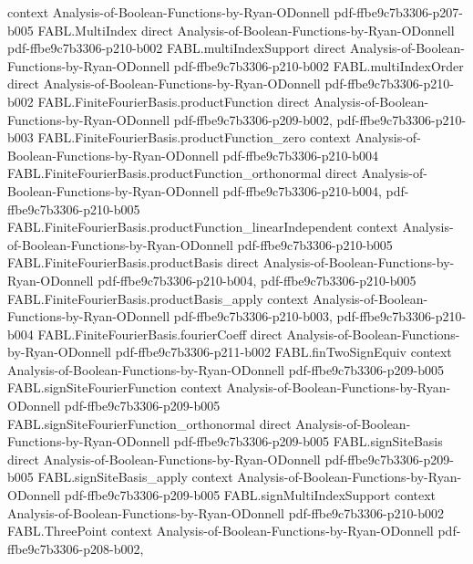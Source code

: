\begin{theorem}
  {context}
  {Analysis-of-Boolean-Functions-by-Ryan-ODonnell}
  {pdf-ffbe9c7b3306-p207-b005}
\proofstep
  {FABL.MultiIndex}
  {direct}
  {Analysis-of-Boolean-Functions-by-Ryan-ODonnell}
  {pdf-ffbe9c7b3306-p210-b002}
\proofstep
  {FABL.multiIndexSupport}
  {direct}
  {Analysis-of-Boolean-Functions-by-Ryan-ODonnell}
  {pdf-ffbe9c7b3306-p210-b002}
\proofstep
  {FABL.multiIndexOrder}
  {direct}
  {Analysis-of-Boolean-Functions-by-Ryan-ODonnell}
  {pdf-ffbe9c7b3306-p210-b002}
\proofstep
  {FABL.FiniteFourierBasis.productFunction}
  {direct}
  {Analysis-of-Boolean-Functions-by-Ryan-ODonnell}
  {pdf-ffbe9c7b3306-p209-b002,
    pdf-ffbe9c7b3306-p210-b003}
\proofstep
  {FABL.FiniteFourierBasis.productFunction_zero}
  {context}
  {Analysis-of-Boolean-Functions-by-Ryan-ODonnell}
  {pdf-ffbe9c7b3306-p210-b004}
\proofstep
  {FABL.FiniteFourierBasis.productFunction_orthonormal}
  {direct}
  {Analysis-of-Boolean-Functions-by-Ryan-ODonnell}
  {pdf-ffbe9c7b3306-p210-b004,
    pdf-ffbe9c7b3306-p210-b005}
\proofstep
  {FABL.FiniteFourierBasis.productFunction_linearIndependent}
  {context}
  {Analysis-of-Boolean-Functions-by-Ryan-ODonnell}
  {pdf-ffbe9c7b3306-p210-b005}
\proofstep
  {FABL.FiniteFourierBasis.productBasis}
  {direct}
  {Analysis-of-Boolean-Functions-by-Ryan-ODonnell}
  {pdf-ffbe9c7b3306-p210-b004,
    pdf-ffbe9c7b3306-p210-b005}
\proofstep
  {FABL.FiniteFourierBasis.productBasis_apply}
  {context}
  {Analysis-of-Boolean-Functions-by-Ryan-ODonnell}
  {pdf-ffbe9c7b3306-p210-b003,
    pdf-ffbe9c7b3306-p210-b004}
\proofstep
  {FABL.FiniteFourierBasis.fourierCoeff}
  {direct}
  {Analysis-of-Boolean-Functions-by-Ryan-ODonnell}
  {pdf-ffbe9c7b3306-p211-b002}
\proofstep
  {FABL.finTwoSignEquiv}
  {context}
  {Analysis-of-Boolean-Functions-by-Ryan-ODonnell}
  {pdf-ffbe9c7b3306-p209-b005}
\proofstep
  {FABL.signSiteFourierFunction}
  {context}
  {Analysis-of-Boolean-Functions-by-Ryan-ODonnell}
  {pdf-ffbe9c7b3306-p209-b005}
\proofstep
  {FABL.signSiteFourierFunction_orthonormal}
  {direct}
  {Analysis-of-Boolean-Functions-by-Ryan-ODonnell}
  {pdf-ffbe9c7b3306-p209-b005}
\proofstep
  {FABL.signSiteBasis}
  {direct}
  {Analysis-of-Boolean-Functions-by-Ryan-ODonnell}
  {pdf-ffbe9c7b3306-p209-b005}
\proofstep
  {FABL.signSiteBasis_apply}
  {context}
  {Analysis-of-Boolean-Functions-by-Ryan-ODonnell}
  {pdf-ffbe9c7b3306-p209-b005}
\proofstep
  {FABL.signMultiIndexSupport}
  {context}
  {Analysis-of-Boolean-Functions-by-Ryan-ODonnell}
  {pdf-ffbe9c7b3306-p210-b002}
\proofstep
  {FABL.ThreePoint}
  {context}
  {Analysis-of-Boolean-Functions-by-Ryan-ODonnell}
  {pdf-ffbe9c7b3306-p208-b002,
}
\end{theorem}
